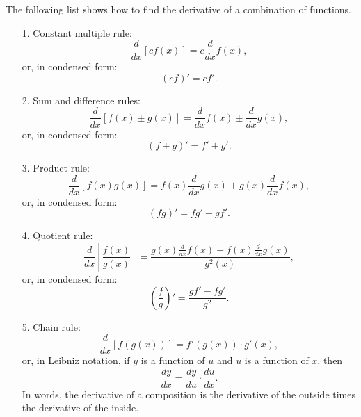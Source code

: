 \documentclass[handout]{ximera}
\begin{document}
The following list shows how to find the derivative of a combination of functions.

\begin{enumerate}

\item[1.] Constant multiple rule:
\[
\frac{d}{dx} \left[cf(x)\right] = c \frac{d}{dx} f(x),
\]
or, in condensed form:
\[
(cf)' = cf'.
\]

\item[2.] Sum and difference rules:
\[
\frac{d}{dx} \left[f(x) \pm g(x)\right] = \frac{d}{dx} f(x) \pm \frac{d}{dx} g(x),
\]
or, in condensed form:
\[
(f \pm g)' = f' \pm g'.
\]

\item[3.] Product rule:
\[
\frac{d}{dx} \left[f(x)g(x)\right] = f(x) \frac{d}{dx} g(x) + g(x) \frac{d}{dx} f(x),
\]
or, in condensed form:
\[
(fg)' = fg' + gf'.
\]

\item[4.] Quotient rule:
\[
\frac{d}{dx} \left[\frac{f(x)}{g(x)}\right] = \frac{g(x) \frac{d}{dx} f(x) - f(x) \frac{d}{dx} g(x)}{g^2(x)},
\]
or, in condensed form:
\[
\left(\frac{f}{g}\right)' =  \frac{gf' - fg'}{g^2}.
\]

\item[5.] Chain rule:
\[
\frac{d}{dx} \left[f(g(x))\right] = f'(g(x)) \cdot g'(x),
\]
or, in Leibniz notation, if $y$ is a function of $u$ and $u$ is a function of $x$, then
\[
\frac{dy}{dx} = \frac{dy}{du} \cdot \frac{du}{dx}.
\]
In words, the derivative of a composition is the derivative of the outside times the derivative of the inside.

\end{enumerate}
\end{document}
